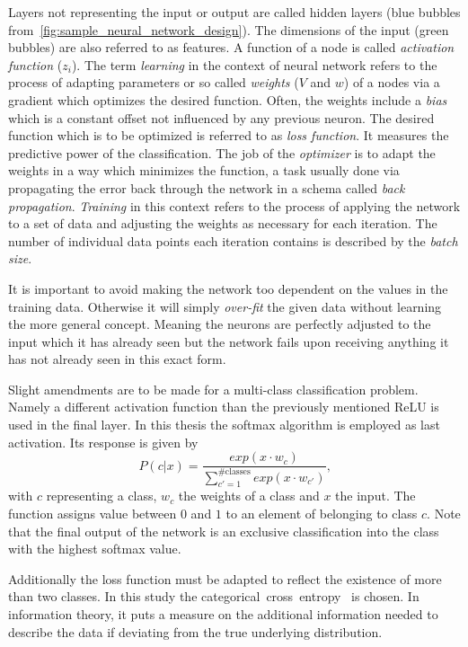 Layers not representing the input or output are called hidden layers (blue bubbles from~\autoref{fig:sample_neural_network_design}). The dimensions of the input (green bubbles) are also referred to as features. A function of a node is called \textit{activation function} ($z_i$). The term \textit{learning} in the context of neural network refers to the process of adapting parameters or so called \textit{weights} ($V$ and $w$) of a nodes via a gradient which optimizes the desired function. Often, the weights include a \textit{bias} which is a constant offset not influenced by any previous neuron. The desired function which is to be optimized is referred to as \textit{loss function}. It measures the predictive power of the classification. The job of the \textit{optimizer} is to adapt the weights in a way which minimizes the function, a task usually done via propagating the error back through the network in a schema called \textit{back propagation}. \textit{Training} in this context refers to the process of applying the network to a set of data and adjusting the weights as necessary for each iteration. The number of individual data points each iteration contains is described by the \textit{batch size}\footnotemark.

It is important to avoid making the network too dependent on the values in the training data. Otherwise it will simply \textit{over-fit} the given data without learning the more general concept. Meaning the neurons are perfectly adjusted to the input which it has already seen but the network fails upon receiving anything it has not already seen in this exact form.


Slight amendments are to be made for a multi-class classification problem. Namely a different activation function than the previously mentioned ReLU is used in the final layer. In this thesis the softmax algorithm is employed as last activation. Its response is given by
\begin{equation}
	P(c | x) = \frac{exp(x \cdot w_c)}{\sum \limits_{c' = 1}^{\#\text{classes}} exp(x \cdot w_{c'})}
	\text{,}
\end{equation}
with $c$ representing a class, $w_c$ the weights of a class and $x$ the input. The function assigns value between $0$ and $1$ to an element of belonging to class $c$. Note that the final output of the network is an exclusive classification into the class with the highest softmax value.

Additionally the loss function must be adapted to reflect the existence of more than two classes. In this study the categorical~cross~entropy~\cite{MachineLearning:LinearClassification} is chosen. In information theory, it puts a measure on the additional information needed to describe the data if deviating from the true underlying distribution.
